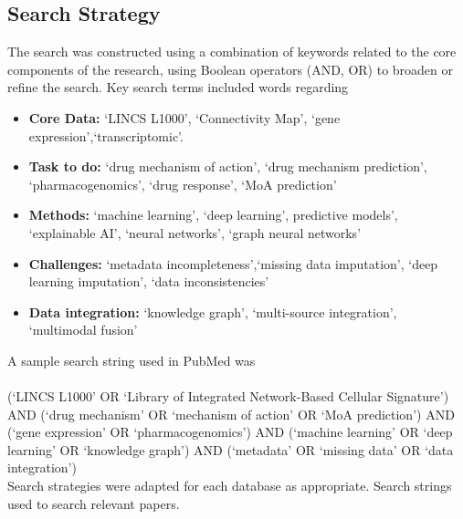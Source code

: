 \documentclass[twocolumn,12pt,a4paper]{article}
\begin{document}
\subsection{Search Strategy}
The search was constructed using a combination of keywords related to the core components of the research, using Boolean operators (AND, OR) to broaden or refine the search. Key search terms included words regarding
\\
\begin{itemize}
    \item \textbf{Core Data:} `LINCS L1000', `Connectivity Map', `gene expression',`transcriptomic'.
    \item  \textbf{Task to do:} `drug mechanism of action', `drug mechanism prediction', `pharmacogenomics', `drug response', `MoA prediction'
    \item  \textbf{Methods:} `machine learning', `deep learning', predictive models', `explainable AI', `neural networks', `graph neural networks'
    \item  \textbf{Challenges:} `metadata incompleteness',`missing data imputation', `deep learning imputation', `data inconsistencies'
    \item  \textbf{Data integration:} `knowledge graph', `multi-source integration', `multimodal fusion'
\end{itemize}
A sample search string used in PubMed was\\
\\
(`LINCS L1000' OR `Library of Integrated Network-Based Cellular Signature') AND 
(`drug mechanism' OR `mechanism of action' OR `MoA prediction') AND 
(`gene expression' OR `pharmacogenomics') AND 
(`machine learning' OR `deep learning' OR `knowledge graph') AND 
(`metadata' OR `missing data' OR `data integration')
\\
Search strategies were adapted for each database as appropriate.
Search strings used to search relevant papers.
\end{document}
